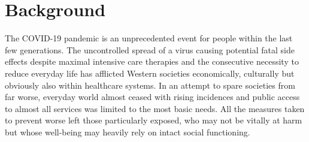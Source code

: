 \documentclass{bmcart}
\begin{document}
\begin{frontmatter}
\begin{abstractbox}
			
			\begin{keyword}				%
			\end{keyword}
			
			
		\end{abstractbox}
		
	\end{frontmatter}
	
	
	
	\section*{Background}
	The COVID-19 pandemic is an unprecedented event for people within the last few generations. The uncontrolled spread of a virus causing potential fatal side effects despite maximal intensive care therapies and the consecutive necessity to reduce everyday life has afflicted Western societies economically, culturally but obviously also within healthcare systems. In an attempt to spare societies from far worse, everyday world almost ceased with rising incidences and public access to almost all services was limited to the most basic needs. All the measures taken to prevent worse left those particularly exposed, who may not be vitally at harm but whose well-being may heavily rely on intact social functioning.
\end{document}
